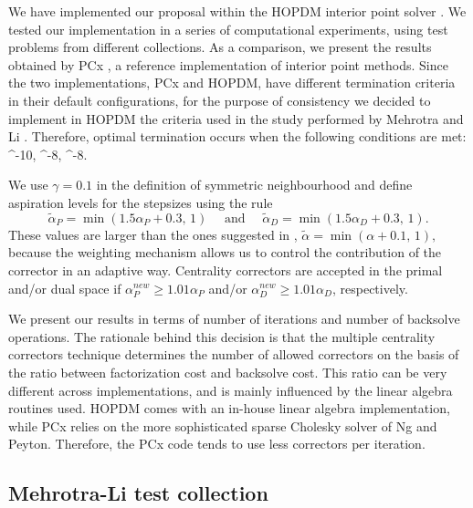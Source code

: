 We have implemented our proposal within the HOPDM interior point solver 
\cite{HOPDM}. 
%
%
We tested our implementation in a series of computational 
experiments, using test problems from different collections. 
As a comparison, we present the results obtained by PCx \cite{PCx}, 
a reference implementation of interior point methods. Since the two 
implementations, PCx and HOPDM, have different termination criteria 
in their default configurations, for the purpose of consistency 
we decided to implement in HOPDM the criteria used in the study 
performed by Mehrotra and Li \cite{MehrotraLi}.
Therefore, optimal termination occurs when the following conditions
are met:
%
\be \label{TermCriteria}
 ^{-10}, \qquad
{} ^{-8},  \qquad
{} ^{-8}.
\ee


We use $\gamma = 0.1$ in the definition of symmetric 
neighbourhood and define aspiration levels for the stepsizes using the rule
\[
  \tilde{\alpha}_{P} = \min(1.5 \alpha_{P} \! + \! 0.3, \, 1) 
  \quad \mbox{ and } \quad
  \tilde{\alpha}_{D} = \min(1.5 \alpha_{D} \! + \! 0.3, \, 1). 
\]
These values are larger than the ones suggested in \cite{Gondzio96}, 
$\tilde{\alpha} = \min (\alpha + 0.1, \, 1),$
because the weighting mechanism allows us to control 
the contribution of the corrector in an adaptive way. 
Centrality correctors are accepted in the primal and/or dual space
if ${\alpha}_{P}^{new} \geq 1.01 \alpha_{P}$ 
and/or ${\alpha}_{D}^{new} \geq 1.01 \alpha_{D}$, respectively.

We present our results in terms of number of iterations and number 
of backsolve operations. The rationale behind this decision is that 
the multiple centrality correctors technique determines the number 
of allowed correctors on the basis of the ratio between factorization 
cost and backsolve cost. This ratio can be very different across 
implementations, and is mainly influenced by the linear algebra 
routines used. 
HOPDM comes with an in-house linear algebra implementation, while
PCx relies on the more sophisticated sparse Cholesky solver
of Ng and Peyton. Therefore, the PCx code tends to use less 
correctors per iteration.

%
%
\subsection{Mehrotra-Li test collection}
\label{ML-tests}

